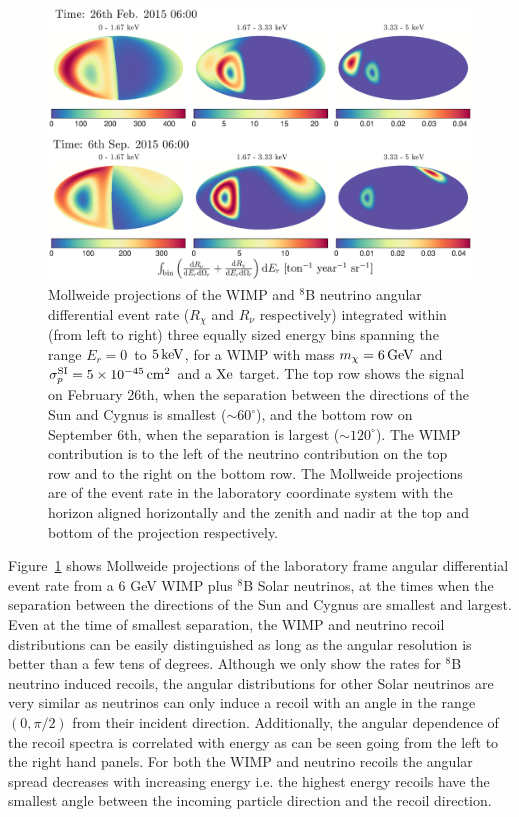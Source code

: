 \begin{figure}
\begin{center}
\includegraphics[trim = 0mm 0mm 0mm 0mm, clip, width=\textwidth,angle=0]{Figures/mollweide_minmax_times.eps}
\caption[Mollweide projections of the WIMP and $^8$B neutrino event rates]{Mollweide projections of the WIMP and $^8$B neutrino angular differential event rate ($R_\chi$ and $R_\nu$ respectively) integrated within (from left to right) three equally sized energy bins spanning the range $E_{r} = 0 \,$ to $5 \, {\rm keV}$, for a WIMP with mass $m_{\chi} = 6 \, {\rm GeV}$ and $\sigma^{\rm SI}_p = 5 \times 10^{-45} \, {\rm cm}^2$ and a ${\rm Xe}$ target.
The top row shows the signal on February 26th, when the separation between the directions of the Sun and Cygnus is smallest ($\sim 60^{\circ}$), and the bottom row on September 6th, when the separation is largest ($\sim 120^{\circ}$). The WIMP contribution is to the left of the neutrino contribution on the top row and to the right on the bottom row. The Mollweide projections are of the event rate in the laboratory coordinate system with the horizon aligned horizontally and the zenith and nadir at the top and bottom of the projection respectively.} 
\label{fig:Moll}
\end{center}
\end{figure}
Figure~\ref{fig:Moll} shows Mollweide projections of the laboratory frame angular differential event rate from a 6 GeV WIMP plus $^8$B Solar neutrinos,  at the times when the separation between the directions of the Sun and Cygnus are smallest and largest. Even at the time of smallest separation, the WIMP and neutrino recoil distributions can be easily distinguished as long as the angular resolution is better than a few tens of degrees. Although we only show the rates for $^8$B neutrino induced recoils, the angular distributions for other Solar neutrinos are very similar as neutrinos can only induce a recoil with an angle in the range $(0,\pi/2)$ from their incident direction. Additionally, the angular dependence of the recoil spectra is correlated with energy as can be seen going from the left to the right hand panels. For both the WIMP and neutrino recoils the angular spread decreases with increasing energy i.e. the highest energy recoils have the smallest angle between the incoming particle direction and the recoil direction.





